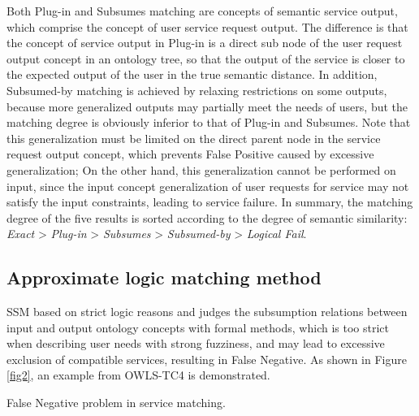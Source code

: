 \documentclass{ieeeaccess}
\begin{document}
Both Plug-in and Subsumes matching are concepts of semantic service output, which comprise the concept of user service request output. The difference is that the concept of service output in Plug-in is a direct sub node of the user request output concept in an ontology tree, so that the output of the service is closer to the expected output of the user in the true semantic distance. In addition, Subsumed-by matching is achieved by relaxing restrictions on some outputs, because more generalized outputs may partially meet the needs of users, but the matching degree is obviously inferior to that of Plug-in and Subsumes. Note that this generalization must be limited on the direct parent node in the service request output concept, which prevents False Positive caused by excessive generalization; On the other hand, this generalization cannot be performed on input, since the input concept generalization of user requests for service may not satisfy the input constraints, leading to service failure. In summary, the matching degree of the five results is sorted according to the degree of semantic similarity: \textit{Exact} > \textit{Plug-in} > \textit{Subsumes} > \textit{Subsumed-by} > \textit{Logical Fail}.

\subsection{Approximate logic matching method}
\label{2.2}
SSM based on strict logic reasons and judges the subsumption relations between input and output ontology concepts with formal methods, which is too strict when describing user needs with strong fuzziness, and may lead to excessive exclusion of compatible services, resulting in False Negative. As shown in Figure \ref{fig2}, an example from OWLS-TC4 is demonstrated.

{False Negative problem in service matching.
\label{fig2}}
\end{document}
